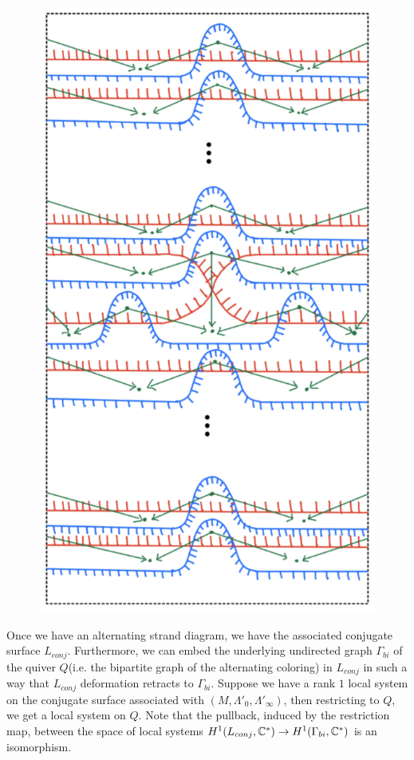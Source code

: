 \begin{figure}[H] 
    \centering
    \includegraphics[scale = 0.55]{diagrams/local_systems_on_as_diagrams/2.png} 
    \caption{}
    \label{fig:your-label}
\end{figure}

Once we have an alternating strand diagram, we have the associated conjugate surface $L_{conj}$. Furthermore, we can embed the underlying undirected graph $\Gamma_{bi}$ of the quiver $Q$(i.e. the bipartite graph of the alternating coloring) in $L_{conj}$ in such a way that $L_{conj}$ deformation retracts to $\Gamma_{bi}$. Suppose we have a rank $1$ local system on the conjugate surface associated with $(M, \Lambda'_0, \Lambda'_\infty)$, then restricting to $Q$, we get a local system on $Q$. Note that the pullback, induced by the restriction map, between the space of local systems $H^1(L_{conj}, \mathbb{C}^*) \rightarrow  H^1(\Gamma_{bi},\mathbb{C}^*)$ is an isomorphism.

